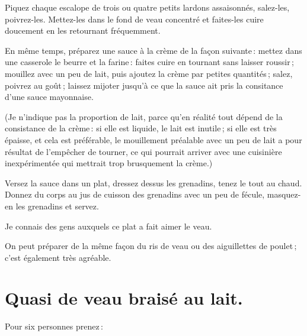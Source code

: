 \medskip

Piquez chaque escalope de trois ou quatre petits lardons assaisonnés,
salez-les, poivrez-les. Mettez-les dans le fond de veau concentré et faites-les
cuire doucement en les retournant fréquemment.

En même temps, préparez une sauce à la crème de la façon suivante : mettez dans
une casserole le beurre et la farine : faites cuire en tournant sans laisser
roussir ; mouillez avec un peu de lait, puis ajoutez la crème par petites
quantités ; salez, poivrez au goût ; laissez mijoter jusqu'à ce que la sauce
ait pris la consitance d'une sauce mayonnaise.

(Je n'indique pas la proportion de lait, parce qu'en réalité tout dépend de la
consistance de la crème : si elle est liquide, le lait est inutile ; si elle
est très épaisse, et cela est préférable, le mouillement préalable avec un peu
de lait a pour résultat de l'empêcher de tourner, ce qui pourrait arriver avec
une cuisinière inexpérimentée qui mettrait trop brusquement la crème.)

Versez la sauce dans un plat, dressez dessus les grenadins, tenez le tout au
chaud. Donnez du corps au jus de cuisson des grenadins avec un peu de fécule,
masquez-en les grenadins et servez.

Je connais des gens auxquels ce plat a fait aimer le veau.

\sk

On peut préparer de la même façon du ris de veau ou des aiguillettes de
poulet ; c'est également très agréable.

\section*{\centering Quasi de veau braisé au lait.}
{}

Pour six personnes prenez :

\medskip

